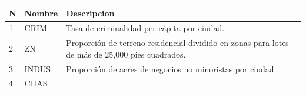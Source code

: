 \documentclass[11pt]{article}
\begin{document}
    \begin{longtable}[]{@{}lll@{}}
\toprule
\begin{minipage}[b]{0.08\columnwidth}\raggedright\strut
\textbf{N}\strut
\end{minipage} & \begin{minipage}[b]{0.14\columnwidth}\raggedright\strut
\textbf{Nombre}\strut
\end{minipage} & \begin{minipage}[b]{0.20\columnwidth}\raggedright\strut
\textbf{Descripcion}\strut
\end{minipage}\tabularnewline
\midrule
\endhead
\begin{minipage}[t]{0.08\columnwidth}\raggedright\strut
1\strut
\end{minipage} & \begin{minipage}[t]{0.14\columnwidth}\raggedright\strut
CRIM\strut
\end{minipage} & \begin{minipage}[t]{0.20\columnwidth}\raggedright\strut
Tasa de criminalidad per cápita por ciudad.\strut
\end{minipage}\tabularnewline
\begin{minipage}[t]{0.08\columnwidth}\raggedright\strut
2\strut
\end{minipage} & \begin{minipage}[t]{0.14\columnwidth}\raggedright\strut
ZN\strut
\end{minipage} & \begin{minipage}[t]{0.20\columnwidth}\raggedright\strut
Proporción de terreno residencial dividido en zonas para lotes de más de
25,000 pies cuadrados.\strut
\end{minipage}\tabularnewline
\begin{minipage}[t]{0.08\columnwidth}\raggedright\strut
3\strut
\end{minipage} & \begin{minipage}[t]{0.14\columnwidth}\raggedright\strut
INDUS\strut
\end{minipage} & \begin{minipage}[t]{0.20\columnwidth}\raggedright\strut
Proporción de acres de negocios no minoristas por ciudad.\strut
\end{minipage}\tabularnewline
\begin{minipage}[t]{0.08\columnwidth}\raggedright\strut
4\strut
\end{minipage} & \begin{minipage}[t]{0.14\columnwidth}\raggedright\strut
CHAS\strut
\end{minipage} & \begin{minipage}[t]{0.20\columnwidth}\raggedright\strut

\end{minipage}
\end{longtable}
\end{document}
